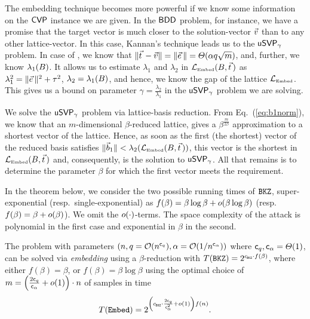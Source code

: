  The embedding technique becomes more powerful if we know some information on the $\textsf{CVP}$ instance we are given. In the $\textsf{BDD}$ problem, for instance, we have a promise that the target vector is much closer to the solution-vector $\vvec$ than to any other lattice-vector. In this case, Kannan's technique leads us to the $\textsf{uSVP}_{\gamma}$ problem. In case of \LWE, we know that $\| \tvec - \vvec \| = \| \evec \| = \TLandau(\alpha q \sqrt{m})$, and, further, we know $\lambda_1(B)$. It allows us to estimate $\lambda_1$ and $\lambda_2$ in $\LEmb(\BMat, \tvec)$ as $\lambda_1^2= \| \evec \|^2 + \tau^2$, $\lambda_2 = \lambda_1(B)$, and hence, we know the gap of the lattice $\mathcal{L}_{\mbox{\tiny Embed}}$. This gives us a bound on parameter $\gamma = \frac{\lambda_2}{\lambda_1}$ in the $\textsf{uSVP}_{\gamma}$ problem we are solving. 

We solve the $\textsf{uSVP}_{\gamma}$ problem via lattice-basis reduction. From Eq.~(\ref{eq:b1norm}), we know that an $m$-dimensional $\beta$-\BKZ reduced lattice, gives a $\beta^{\frac{m}{2 \beta}}$ approximation to a shortest vector of the lattice. Hence, as soon as the first (the shortest) vector of the reduced basis satisfies $\| \bvec_1 \| < \lambda_2(\LEmb(\BMat, \tvec))$, this vector is the shortest in $\LEmb(\BMat, \tvec)$ and, consequently, is the solution to $\textsf{uSVP}_{\gamma}$. All that remains is to determine the \BKZ parameter $\beta$ for which the first vector meets the requirement. 

In the theorem below, we consider the two possible running times of $\texttt{BKZ}$, super-exponential (resp.\ single-exponential) as $f(\beta) = \beta \log \beta + o(\beta \log \beta)$ (resp.\ $f(\beta) = \beta + o(\beta)$). We omit the $o(\cdot)$-terms. The space complexity of the attack is polynomial in the first case and exponential in $\beta$ in the second.
\begin{thm} \label{thm:Embed}
	The \LWE problem with parameters $(n, q=\mathcal{O}(n^{\mathsf{c}_q}), \alpha = \mathcal{O}(1 / n^{\mathsf{c}_{\alpha}}) )$ where $\mathsf{c}_q, \mathsf{c}_{\alpha} = \varTheta(1)$, can be solved via \emph{embedding} using a $\beta$-\BKZ reduction with $T(\BKZ) = 2^{\cBKZ \cdot f(\beta)}$, where either $f(\beta) = \beta$, or $f(\beta) = \beta \log \beta$ using the optimal choice of $m = \left( \frac{2 \mathsf{c}_q}{\mathsf{c}_{\alpha}} + o(1) \right) \cdot n$ of \LWE samples in time
	\[
		T(\Embed) = 2^{\left( \cBKZ \cdot \frac{2\cq}{\ca^2} + \smallo(1) \right) f(n)}.
	\]
\end{thm}

